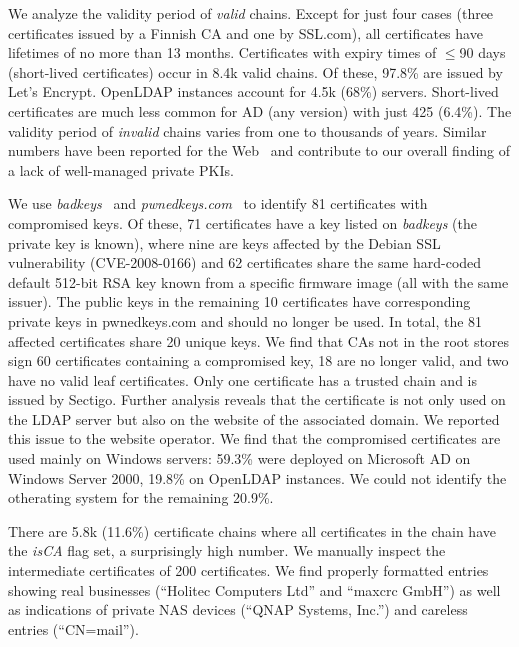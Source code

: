 We analyze the validity period of \textit{valid} chains. Except for just four cases (three certificates issued by a Finnish CA and one by SSL.com), all certificates have lifetimes of no more than 13 months. Certificates with expiry times of $\leq$90 days (short-lived certificates) occur in 8.4k valid chains. Of these, 97.8\% are issued by Let's Encrypt. OpenLDAP instances account for 4.5k (68\%) servers. Short-lived certificates are much less common for \gls{AD} (any version) with just 425 (6.4\%). 
The validity period of \textit{invalid} chains varies from one to thousands of years. Similar numbers have been reported for the Web~\cite{holz2011} and contribute to our overall finding of a lack of well-managed private PKIs.

We use \textit{badkeys}~\cite{badkeys} and \textit{pwnedkeys.com}~\cite{pwnedkeys} to identify 81 certificates with compromised keys. Of these, 71 certificates have a key listed on \textit{badkeys} (the private key is known), where nine are keys affected by the Debian SSL vulnerability (CVE-2008-0166) and 62 certificates share the same hard-coded default 512-bit RSA key known from a specific firmware image (all with the same issuer).
The public keys in the remaining 10 certificates have corresponding private keys in pwnedkeys.com and should no longer be used. In total, the 81 affected certificates share 20 unique keys.
We find that \glspl{CA} not in the root stores sign 60 certificates containing a compromised key, 18 are no longer valid, and two have no valid leaf certificates.
Only one certificate has a trusted chain and is issued by Sectigo. Further analysis reveals that the certificate is not only used on the LDAP server but also on the website of the associated domain. We reported this issue to the website operator. 
We find that the compromised certificates are used mainly on Windows servers: 59.3\% were deployed on Microsoft \gls{AD} on Windows Server 2000, 19.8\% on OpenLDAP instances. We could not identify the otherating system for the remaining 20.9\%. 

There are 5.8k (11.6\%) certificate chains where all certificates in the chain have the \textit{isCA} flag set, a surprisingly high number.
We manually inspect the intermediate certificates of 200 certificates. We find properly formatted entries showing real businesses (``Holitec Computers Ltd'' and ``maxcrc GmbH'') as well as indications of private NAS devices (``QNAP Systems, Inc.'') and careless entries (``CN=mail'').

